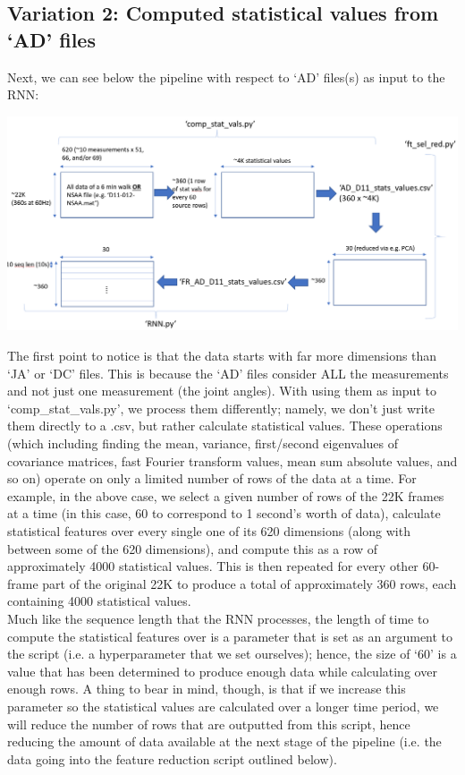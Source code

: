 \documentclass[12pt,twoside]{report}
\begin{document}
\subsection{Variation 2: Computed statistical values from ‘AD’ files}

\quad Next, we can see below the pipeline with respect to ‘AD’ files(s) as input to the RNN:

\begin{center}
\includegraphics[scale=0.2]{project_figures/fig8_7}
\end{center}

\quad The first point to notice is that the data starts with far more dimensions than ‘JA’ or ‘DC’ files. This is because the ‘AD’ files consider ALL the measurements and not just one measurement (the joint angles). With using them as input to ‘comp\_stat\_vals.py’, we process them differently; namely, we don’t just write them directly to a .csv, but rather calculate statistical values. These operations (which including finding the mean, variance, first/second eigenvalues of covariance matrices, fast Fourier transform values, mean sum absolute values, and so on) operate on only a limited number of rows of the data at a time. For example, in the above case, we select a given number of rows of the 22K frames at a time (in this case, 60 to correspond to 1 second’s worth of data), calculate statistical features over every single one of its 620 dimensions (along with between some of the 620 dimensions), and compute this as a row of approximately 4000 statistical values. This is then repeated for every other 60-frame part of the original 22K to produce a total of approximately 360 rows, each containing 4000 statistical values.\\

\quad Much like the sequence length that the RNN processes, the length of time to compute the statistical features over is a parameter that is set as an argument to the script (i.e. a hyperparameter that we set ourselves); hence, the size of ‘60’ is a value that has been determined to produce enough data while calculating over enough rows. A thing to bear in mind, though, is that if we increase this parameter so the statistical values are calculated over a longer time period, we will reduce the number of rows that are outputted from this script, hence reducing the amount of data available at the next stage of the pipeline (i.e. the data going into the feature reduction script outlined below).\\
\end{document}
